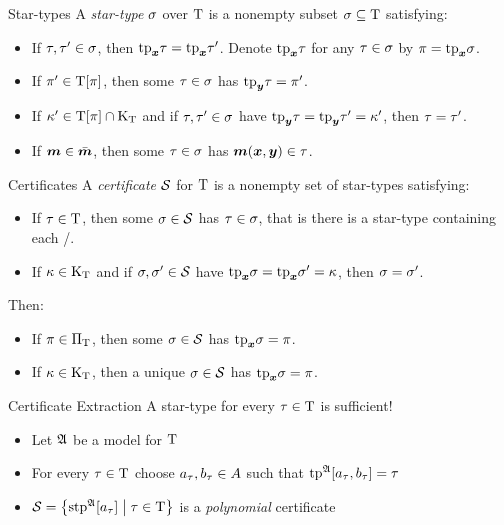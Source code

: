 \documentclass{beamer}
\begin{document}
\begin{frame}{Star-types}
A \emph{star-type} $\sigma$ over $\mathrm{T}$ is a nonempty subset
$\sigma\subseteq\mathrm{T}$ satisfying:
\begin{itemize}
  \item[\condstpx]\label{cond:stpx}
  If $\tau, {\tau'} \in \sigma$, then $\mathrm{tp}_{\bm{x}}\tau = \mathrm{tp}_{\bm{x}}{\tau'}$.
  Denote $\mathrm{tp}_{\bm{x}}\tau$ for any $\tau \in \sigma$ by $\pi=\mathrm{tp}_{\bm{x}}\sigma$.
  
  \item[\condstppy]\label{cond:stppy}
  If ${\pi'} \in \mathrm{T}[\pi]$, then some $\tau\in\sigma$ has
  $\mathrm{tp}_{\bm{y}}\tau = {\pi'}$.
  
  \item[\condstpky]\label{cond:stpky}
  If ${\kappa'} \in \mathrm{T}[\pi]\cap{\mathrm{K}}_{\mathrm{T}}$
  and if $\tau,{\tau'} \in \sigma$ have $\mathrm{tp}_{\bm{y}}\tau = \mathrm{tp}_{\bm{y}}{\tau'} = {\kappa'}$,
  then $\tau = {\tau'}$.
  
  \item[\condstpm]\label{cond:stpm}
  If $\bm{m} \in \bar{\bm{m}}$, then some $\tau\in\sigma$ has $\bm{m}(\bm{x},\bm{y}) \in \tau$.
\end{itemize}
\end{frame}

\begin{frame}{Certificates}
A \emph{certificate} $\mathcal{S}$ for $\mathrm{T}$ is a nonempty set of star-types
satisfying:
\begin{itemize}
  \item[\condcertT]\label{cond:certT}
  If $\tau\in\mathrm{T}$, then some $\sigma\in\mathcal{S}$ has $\tau\in\sigma$,
  that is there is a star-type containing each \twotype/.
  \item[\condcertk]\label{cond:certk}
  If $\kappa\in{\mathrm{K}}_{\mathrm{T}}$ and if $\sigma,{\sigma'}\in\mathcal{S}$
  have $\mathrm{tp}_{\bm{x}}\sigma = \mathrm{tp}_{\bm{x}}{\sigma'} = \kappa$, then $\sigma = {\sigma'}$.
\end{itemize}
Then:
\begin{itemize}
  \item[\condcertp]\label{cond:certp}
  If $\pi \in {\Pi}_{\mathrm{T}}$, then some $\sigma\in\mathcal{S}$ has $\mathrm{tp}_{\bm{x}}\sigma = \pi$.
  \item[\condcertku]\label{cond:certku}
  If $\kappa \in {\mathrm{K}}_{\mathrm{T}}$, then a unique $\sigma\in\mathcal{S}$ has $\mathrm{tp}_{\bm{x}}\sigma = \pi$.
\end{itemize}
\end{frame}

\begin{frame}{Certificate Extraction}
A star-type for every $\tau\in\mathrm{T}$ is sufficient!
\begin{itemize}
  \item Let $\mathfrak{A}$ be a model for $\mathrm{T}$
  \item For every $\tau\in\mathrm{T}$ choose $a_{\tau},b_{\tau}\in A$ such that
$\operatorname{tp}^{\mathfrak{A}}[a_{\tau},b_{\tau}] = \tau$
  \item $\mathcal{S} = \left\{\operatorname{stp}^{\mathfrak{A}}[a_{\tau}]\mathrel{}\middle|\mathrel{}\tau\in\mathrm{T}\right\}$ is a
  \emph{polynomial} certificate
\end{itemize}
\end{frame}
\end{document}
